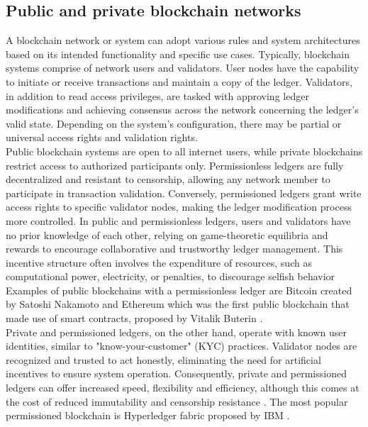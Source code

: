 \subsection{Public and private blockchain networks}
A blockchain network or system can adopt various rules and system architectures based on its intended functionality and specific use cases. Typically, blockchain systems comprise of
network users and validators. User nodes have the capability to initiate or receive transactions and maintain a copy of the ledger. Validators, in addition to read access privileges,
are tasked with approving ledger modifications and achieving consensus across the network concerning the ledger's valid state. Depending on the system's configuration, there may be
partial or universal access rights and validation rights.\\
Public blockchain systems are open to all internet users, while private blockchains restrict access to authorized participants only. Permissionless ledgers are fully decentralized
and resistant to censorship, allowing any network member to participate in transaction validation. Conversely, permissioned ledgers grant write access rights to specific validator
nodes, making the ledger modification process more controlled. In public and permissionless ledgers, users and validators have no prior knowledge of each other, relying on
game-theoretic equilibria and rewards to encourage collaborative and trustworthy ledger management. This incentive structure often involves the expenditure of resources, such as
computational power, electricity, or penalties, to discourage selfish behavior \cite{andoni2019blockchain} Examples of public blockchains with a permissionless ledger are Bitcoin created by Satoshi Nakamoto
\cite{Nakamoto} and Ethereum which was the first public blockchain that made use of smart contracts, proposed by Vitalik Buterin \cite{wood2014ethereum}.\\
Private and permissioned ledgers, on the other hand, operate with known user identities, similar to "know-your-customer" (KYC) practices. Validator nodes are recognized and trusted
to act honestly, eliminating the need for artificial incentives to ensure system operation. Consequently, private and permissioned ledgers can offer increased speed, flexibility
and efficiency, although this comes at the cost of reduced immutability and censorship resistance \cite{andoni2019blockchain}. The most popular permissioned blockchain is Hyperledger fabric proposed by IBM
\cite{androulaki2018hyperledger}.\\

